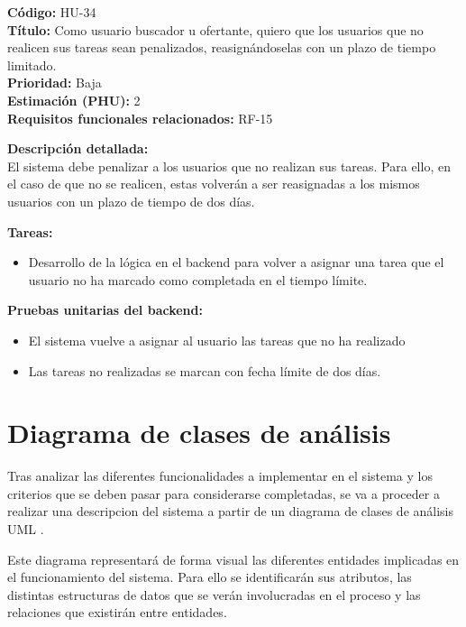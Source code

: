 \begin{tarjetaHU}
\textbf{Código:} HU-34 \\
\textbf{Título:} Como usuario buscador u ofertante, quiero que los usuarios que no realicen sus tareas sean penalizados, reasignándoselas con un plazo de tiempo limitado. \\
\textbf{Prioridad:} Baja \\
\textbf{Estimación (PHU):} 2 \\
\textbf{Requisitos funcionales relacionados:} RF-15

\vspace{0.5em}
\textbf{Descripción detallada:} \\
El sistema debe penalizar a los usuarios que no realizan sus tareas. Para ello, en el caso de que no se realicen, estas volverán a ser reasignadas a los mismos usuarios con un plazo de tiempo de dos días.

\vspace{0.5em}
\textbf{Tareas:}
\begin{itemize}[left=0pt]
  \item Desarrollo de la lógica en el backend para volver a asignar una tarea que el usuario no ha marcado como completada en el tiempo límite.
\end{itemize}

\vspace{0.5em}
\textbf{Pruebas unitarias del backend:}
\begin{itemize}[left=0pt]
  \item El sistema vuelve a asignar al usuario las tareas que no ha realizado
  \item Las tareas no realizadas se marcan con fecha límite de dos días.
\end{itemize}
\end{tarjetaHU}

\section{Diagrama de clases de análisis}

Tras analizar las diferentes funcionalidades a implementar en el sistema y los criterios que se deben pasar para considerarse completadas, se va a proceder a realizar una descripcion del sistema a partir de un diagrama de clases de análisis UML \cite{lucidchartUML}.

Este diagrama representará de forma visual las diferentes entidades implicadas en el funcionamiento del sistema. Para ello se identificarán sus atributos, las distintas estructuras de datos que se verán involucradas en el proceso y las relaciones que existirán entre entidades.

